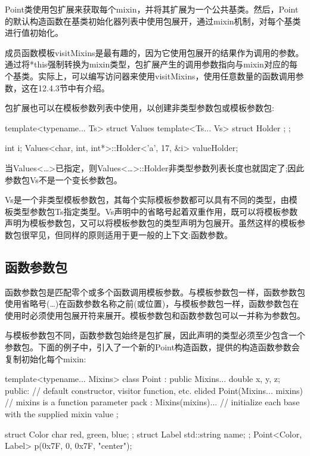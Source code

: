 Point类使用包扩展来获取每个mixin，并将其扩展为一个公共基类。然后，Point的默认构造函数在基类初始化器列表中使用包展开，通过mixin机制，对每个基类进行值初始化。

成员函数模板visitMixins是最有趣的，因为它使用包展开的结果作为调用的参数。通过将*this强制转换为mixin类型，包扩展产生的调用参数指向与mixin对应的每个基类。实际上，可以编写访问器来使用visitMixins，使用任意数量的函数调用参数，这在12.4.3节中有介绍。

包扩展也可以在模板参数列表中使用，以创建非类型参数包或模板参数包:

\begin{cpp}
template<typename... Ts>
struct Values {
	template<Ts... Vs>
	struct Holder {
	};
};

int i;
Values<char, int, int*>::Holder<’a’, 17, &i> valueHolder;
\end{cpp}

当Values<…>已指定，则Values<…>::Holder非类型参数列表长度也就固定了;因此参数包Vs不是一个变长参数包。

Vs是一个非类型模板参数包，其每个实际模板参数都可以具有不同的类型，由模板类型参数包Ts指定类型。Vs声明中的省略号起着双重作用，既可以将模板参数声明为模板参数包，又可以将模板参数包的类型声明为包展开。虽然这样的模板参数包很罕见，但同样的原则适用于更一般的上下文:函数参数。

\subsection{函数参数包}

函数参数包是匹配零个或多个函数调用模板参数。与模板参数包一样，函数参数包使用省略号(…)在函数参数名称之前(或位置)，与模板参数包一样，函数参数包在使用时必须使用包展开符来展开。模板参数包和函数参数包可以一并称为参数包。

与模板参数包不同，函数参数包始终是包扩展，因此声明的类型必须至少包含一个参数包。下面的例子中，引入了一个新的Point构造函数，提供的构造函数参数会复制初始化每个mixin:

\begin{cpp}
template<typename... Mixins>
class Point : public Mixins...
{
	double x, y, z;
public:
	// default constructor, visitor function, etc. elided
	Point(Mixins... mixins) // mixins is a function parameter pack
		: Mixins(mixins)... { } // initialize each base with the supplied mixin value
};

struct Color { char red, green, blue; };
struct Label { std::string name; };
Point<Color, Label> p({0x7F, 0, 0x7F}, {"center"});
\end{cpp}


